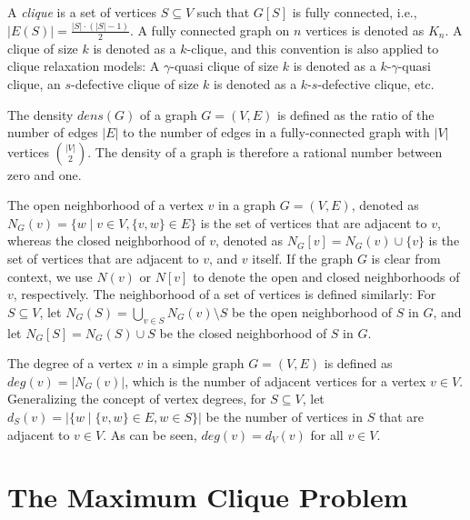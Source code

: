 \documentclass[draft,final]{vutinfth} %
\begin{document}
A \emph{clique} is a set of vertices $S \subseteq V$ such that $G[S]$ is fully connected, i.e., $|E(S)| = \frac{|S| \cdot (|S|-1)}{2}$. A fully connected graph on $n$ vertices is denoted as $K_n$. A clique of size $k$ is denoted as a $k$-clique, and this convention is also applied to clique relaxation models: A $\gamma$-quasi clique of size $k$ is denoted as a $k$-$\gamma$-quasi clique, an $s$-defective clique of size $k$ is denoted as a $k$-$s$-defective clique, etc. 

The density $\mathit{dens}(G)$ of a graph $G = (V,E)$ is defined as the ratio of the number of edges $|E|$ to the number of edges in a fully-connected graph with $|V|$ vertices $\binom{|V|}{2}$. 
The density of a graph is therefore a rational number between zero and one. 

The open neighborhood of a vertex $v$ in a graph $G = (V,E)$, denoted as $N_G(v) = \{ w \mid v \in V, \{v,w\} \in E\}$ is the set of vertices that are adjacent to $v$, whereas the closed neighborhood of $v$, denoted as $N_G[v] = N_G(v) \cup \{v\}$ is the set of vertices that are adjacent to $v$, and $v$ itself. 
If the graph $G$ is clear from context, we use $N(v)$ or $N[v]$ to denote the open and closed neighborhoods of $v$, respectively. 
The neighborhood of a set of vertices is defined similarly: For $S \subseteq V$, let $N_G(S) = \bigcup_{v \in S} N_G(v) \setminus S$ be the open neighborhood of $S$ in $G$, and let $N_G[S] = N_G(S) \cup S$ be the closed neighborhood of $S$ in $G$. 

The degree of a vertex $v$ in a simple graph $G = (V,E)$ is defined as $\mathit{deg}(v) = |N_G(v)|$, which is the number of adjacent vertices for a vertex $v \in V$. Generalizing the concept of vertex degrees, for $S \subseteq V$, let $d_S(v) = |\{w \mid \{v,w\} \in E, w \in S\}|$ be the number of vertices in $S$ that are adjacent to $v \in V$. As can be seen, $\mathit{deg}(v) = d_V(v) $ for all $v \in V$. 


\section{The Maximum Clique Problem}\label{sec:mcp}
\end{document}
